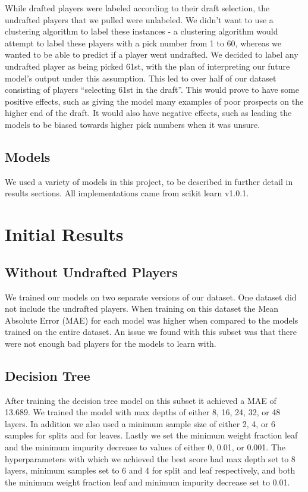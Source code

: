 \documentclass{article}
\begin{document}
While drafted players were labeled according to their draft selection, the
undrafted players that we pulled were unlabeled. We didn’t want to use a
clustering algorithm to label these instances - a clustering algorithm would
attempt to label these players with a pick number from 1 to 60, whereas we
wanted to be able to predict if a player went undrafted. We decided to label any
undrafted player as being picked 61st, with the plan of interpreting our future
model’s output under this assumption. This led to over half of our dataset
consisting of players “selecting 61st in the draft”. This would prove to have
some positive effects, such as giving the model many examples of poor prospects
on the higher end of the draft. It would also have negative effects, such as
leading the models to be biased towards higher pick numbers when it was unsure. 

\subsection{Models}

We used a variety of models in this project, to be described in further detail
in results sections. All implementations came from scikit learn v1.0.1.

\section{Initial Results}

\subsection{Without Undrafted Players}

We trained our models on two separate versions of our dataset. One dataset did not include
the undrafted players. When training on this dataset the Mean Absolute Error (MAE) for each model was higher 
when compared to the models trained on the entire dataset. An issue we found with this subset was that there
were not enough bad players for the models to learn with.

\subsection{Decision Tree}

After training the decision tree model on this subset it achieved a MAE of 13.689. 
We trained the model with max depths of either 8, 16, 24, 32, or 48 layers. In addition we also used a minimum sample size of either 2, 4, or 6 samples 
for splits and for leaves. Lastly we set the minimum weight fraction leaf and the minimum impurity decrease to values of either 0, 0.01, or 0.001.
The hyperparameters with which we achieved the best score had max depth set to 8 layers, minimum samples set to 6 and 4 for split and leaf respectively, and both the minimum weight fraction leaf and minimum impurity decrease set to 0.01.
\end{document}
